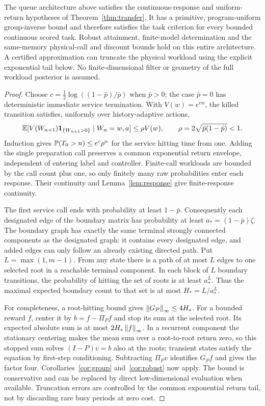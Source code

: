\begin{theorem}\label{thm:queue}
The queue architecture above satisfies the continuous-response and uniform-return hypotheses of Theorem~\ref{thm:transfer}. It has a primitive, program-uniform group-inverse bound and therefore satisfies the task criterion for every bounded continuous scored task. Robust attainment, finite-model determination and the same-memory physical-call and discount bounds hold on this entire architecture. A certified approximation can truncate the physical workload using the explicit exponential tail below. No finite-dimensional filter or geometry of the full workload posterior is assumed.
\end{theorem}
\begin{proof}
Choose $c=\frac12\log((1-\bar p)/\bar p)$ when $\bar p>0$; the case $\bar p=0$ has deterministic immediate service termination. With $V(w)=e^{cw}$, the killed transition satisfies, uniformly over history-adaptive actions,
\[
 \mathbb E[V(W_{n+1})\mathbf 1_{\{W_{n+1}>0\}}\mid W_n=w,a]
 \le\rho V(w),\qquad \rho=2\sqrt{\bar p(1-\bar p)}<1.
\]
Induction gives $\mathbb P(T_0>n)\le e^c\rho^n$ for the service hitting time from one. Adding the single preparation call preserves a common exponential return envelope, independent of entering label and controller. Finite-call workloads are bounded by the call count plus one, so only finitely many raw probabilities enter each response. Their continuity and Lemma~\ref{lem:response} give finite-response continuity.

The first service call ends with probability at least $1-\bar p$. Consequently each designated edge of the boundary matrix has probability at least $a_*= (1-\bar p)\zeta$. The boundary graph has exactly the same terminal strongly connected components as the designated graph: it contains every designated edge, and added edges can only follow an already existing directed path. Put $L=\max(1,m-1)$. From any state there is a path of at most $L$ edges to one selected root in a reachable terminal component. In each block of $L$ boundary transitions, the probability of hitting the set of roots is at least $a_*^L$. Thus the maximal expected boundary count to that set is at most $H_*=L/a_*^L$.

For completeness, a root-hitting bound gives $\left\lVert G_P\right\rVert_\infty\le4H_*$. For a bounded reward $f$, center it by $b=f-\Pi_Pf$ and stop its sum at the selected root. Its expected absolute sum is at most $2H_*\left\lVert f\right\rVert_\infty$. In a recurrent component the stationary centering makes the mean sum over a root-to-root return zero, so this stopped sum solves $(I-P)v=b$ also at the roots; transient states satisfy the equation by first-step conditioning. Subtracting $\Pi_Pv$ identifies $G_Pf$ and gives the factor four. Corollaries~\ref{cor:group} and~\ref{cor:robust} now apply. The bound is conservative and can be replaced by direct low-dimensional evaluation when available. Truncation errors are controlled by the common exponential return tail, not by discarding rare busy periods at zero cost.
\end{proof}
